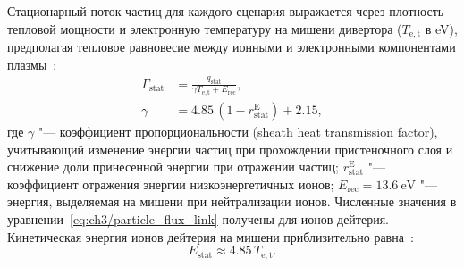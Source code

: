 Стационарный поток частиц для каждого сценария выражается через плотность тепловой мощности и электронную температуру на мишени дивертора ($T_{\mathrm{e,t}}$ в \si{\electronvolt}), предполагая тепловое равновесие между ионными и электронными компонентами плазмы~\cite{Brida2017, Stangeby2000}:
\begin{subequations}
	\label{eq:ch3/particle_flux_link}
	\begin{align}
		\Gamma_{\mathrm{stat}} & =\frac{q_{\mathrm{stat}}}{\gamma T_{\mathrm{e,t}} + E_{\mathrm{rec}}}, \\
		\gamma                 & =4.85\,(1-r_{\mathrm{stat}}^{\mathrm{E}})+2.15,
	\end{align}
\end{subequations}
где $\gamma$ "--- коэффициент пропорциональности (sheath heat transmission factor), учитывающий изменение энергии частиц при прохождении пристеночного слоя и снижение доли принесенной энергии при отражении частиц; $r_{\mathrm{stat}}^{\mathrm{E}}$ "--- коэффициент отражения энергии низкоэнергетичных ионов; $E_{\mathrm{rec}}=\SI{13.6}{\electronvolt}$ "--- энергия, выделяемая на мишени при нейтрализации ионов. Численные значения в уравнении~\cref{eq:ch3/particle_flux_link} получены для ионов дейтерия. Кинетическая энергия ионов дейтерия на мишени приблизительно равна~\cite{Brida2017}:
\begin{equation}
	\label{eq:ch3/stat_energy}
	E_{\mathrm{stat}}\approx 4.85\, T_{\mathrm{e,t}}.
\end{equation}

